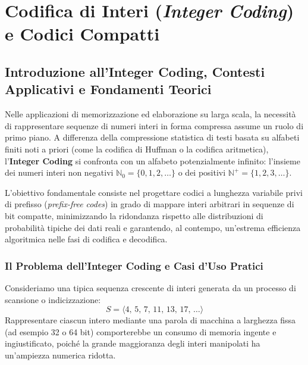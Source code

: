 \chapter{Codifica di Interi (\textit{Integer Coding}) e Codici Compatti}
\label{ch:integer-coding}

\section{Introduzione all'Integer Coding, Contesti Applicativi e Fondamenti Teorici}
\label{sec:intro-integer-coding}

Nelle applicazioni di memorizzazione ed elaborazione su larga scala, la necessit\`a di rappresentare sequenze di numeri interi in forma compressa assume un ruolo di primo piano. A differenza della compressione statistica di testi basata su alfabeti finiti noti a priori (come la codifica di Huffman o la codifica aritmetica), l'\textbf{Integer Coding} si confronta con un alfabeto potenzialmente infinito: l'insieme dei numeri interi non negativi $\mathbb{N}_0 = \{0, 1, 2, \dots\}$ o dei positivi $\mathbb{N}^+ = \{1, 2, 3, \dots\}$.

L'obiettivo fondamentale consiste nel progettare codici a lunghezza variabile privi di prefisso (\textit{prefix-free codes}) in grado di mappare interi arbitrari in sequenze di bit compatte, minimizzando la ridondanza rispetto alle distribuzioni di probabilit\`a tipiche dei dati reali e garantendo, al contempo, un'estrema efficienza algoritmica nelle fasi di codifica e decodifica.

\FloatBarrier
\subsection{Il Problema dell'Integer Coding e Casi d'Uso Pratici}
\label{subsec:casi-uso-integer-coding}

Consideriamo una tipica sequenza crescente di interi generata da un processo di scansione o indicizzazione:
\begin{equation}
  S = \langle 4, \, 5, \, 7, \, 11, \, 13, \, 17, \, \dots \rangle
\end{equation}
Rappresentare ciascun intero mediante una parola di macchina a larghezza fissa (ad esempio 32 o 64 bit) comporterebbe un consumo di memoria ingente e ingiustificato, poich\'e la grande maggioranza degli interi manipolati ha un'ampiezza numerica ridotta.

